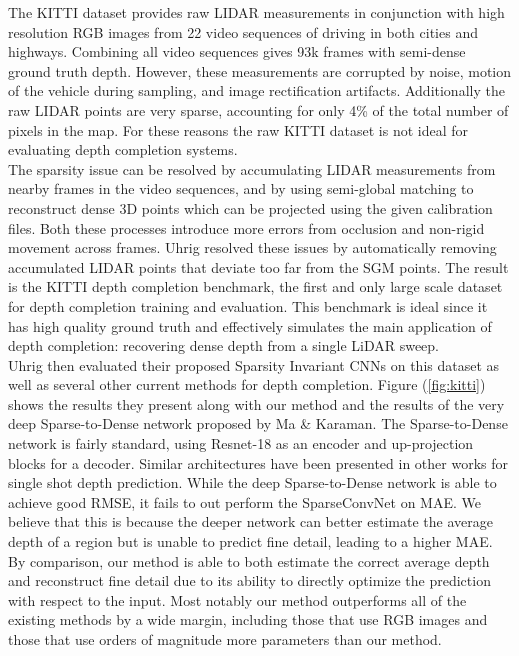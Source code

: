 The KITTI dataset provides raw LIDAR measurements in conjunction with high resolution RGB images from 22 video sequences of driving in both cities and highways. Combining all video sequences gives 93k frames with semi-dense ground truth depth\cite{Geiger2012CVPR}. However, these measurements are corrupted by noise, motion of the vehicle during sampling, and image rectification artifacts. Additionally the raw LIDAR points are very sparse, accounting for only 4\% of the total number of pixels in the map. For these reasons the raw KITTI dataset is not ideal for evaluating depth completion systems.\\

The sparsity issue can be resolved by accumulating LIDAR measurements from nearby frames in the video sequences, and by using semi-global matching to reconstruct dense 3D points which can be projected using the given calibration files. Both these processes introduce more errors from occlusion and non-rigid movement across frames. Uhrig \etal resolved these issues by automatically removing accumulated LIDAR points that deviate too far from the SGM points. The result is the KITTI depth completion benchmark, the first and only large scale dataset for depth completion training and evaluation. This benchmark is ideal since it has high quality ground truth and effectively simulates the main application of depth completion: recovering dense depth from a single LiDAR sweep.\\

Uhrig \etal then evaluated their proposed Sparsity Invariant CNNs on this dataset as well as several other current methods for depth completion. Figure (\ref{fig:kitti}) shows the results they present along with our method and the results of the very deep Sparse-to-Dense network proposed by Ma \& Karaman. The Sparse-to-Dense network is fairly standard, using Resnet-18 as an encoder and up-projection blocks for a decoder. Similar architectures have been presented in other works for single shot depth prediction. While the deep Sparse-to-Dense network is able to achieve good RMSE, it fails to out perform the SparseConvNet on MAE. We believe that this is because the deeper network can better estimate the average depth of a region but is unable to predict fine detail, leading to a higher MAE. By comparison, our method is able to both estimate the correct average depth and reconstruct fine detail due to its ability to directly optimize the prediction with respect to the input. Most notably our method outperforms all of the existing methods by a wide margin, including those that use RGB images and those that use orders of magnitude more parameters than our method.

